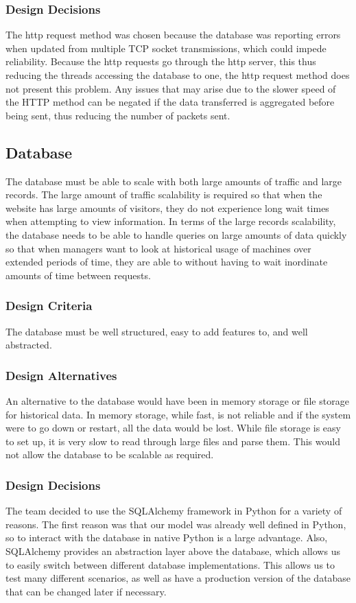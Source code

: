 \documentclass[PPFS.tex]{template/subfiles}
\begin{document}
\subsubsection{Design Decisions}
The http request method was chosen because the database was reporting errors when updated from multiple TCP socket transmissions, which could impede reliability. Because the http requests go through the http server, this thus reducing the threads accessing the database to one, the http request method does not present this problem. Any issues that may arise due to the slower speed of the HTTP method can be negated if the data transferred is aggregated before being sent, thus reducing the number of packets sent.

\subsection{Database}
The database must be able to scale with both large amounts of traffic and large records. The large amount of traffic scalability is required so that when the website has large amounts of visitors, they do not experience long wait times when attempting to view information. In terms of the large records scalability, the database needs to be able to handle queries on large amounts of data quickly so that when managers want to look at historical usage of machines over extended periods of time, they are able to without having to wait inordinate amounts of time between requests.

\subsubsection{Design Criteria}
The database must be well structured, easy to add features to, and well abstracted.

\subsubsection{Design Alternatives}
An alternative to the database would have been in memory storage or file storage for historical data. In memory storage, while fast, is not reliable and if the system were to go down or restart, all the data would be lost. While file storage is easy to set up, it is very slow to read through large files and parse them. This would not allow the database to be scalable as required.

\subsubsection{Design Decisions}
The team decided to use the SQLAlchemy framework in Python for a variety of reasons. The first reason was that our model was already well defined in Python, so to interact with the database in native Python is a large advantage. Also, SQLAlchemy provides an abstraction layer above the database, which allows us to easily switch between different database implementations. This allows us to test many different scenarios, as well as have a production version of the database that can be changed later if necessary.
\end{document}
